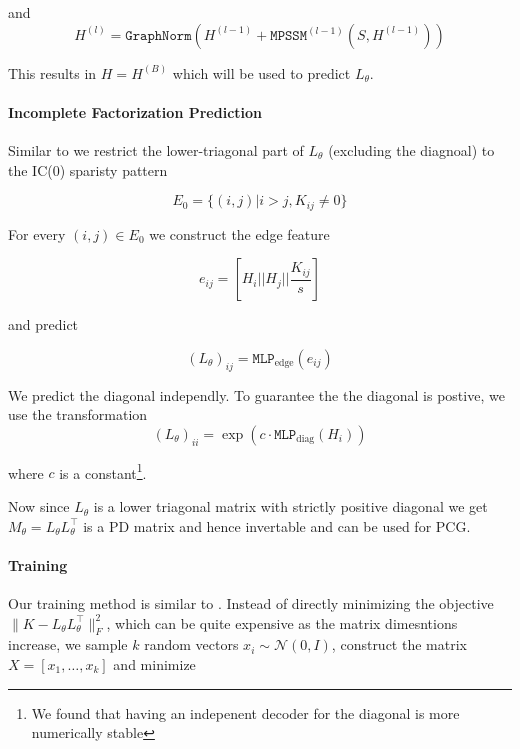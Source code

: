 and
\begin{equation}
    H^{(l)} = \texttt{GraphNorm}(H^{(l - 1)} + \texttt{MPSSM}^{(l - 1)}(S,H^{(l - 1)}))
\end{equation}

This results in $H = H^{(B)}$ which will be used to predict $L_\theta$.

\paragraph{Incomplete Factorization Prediction} Similar to
\cite{hausnerNeuralIncompleteFactorization2024} we restrict the lower-triagonal
part of $L_\theta$ (excluding the diagnoal) to the IC(0) sparisty pattern

\begin{equation}\label{eq:sparsity_pattern}
    E_0 = \{(i,j) | i > j, K_{ij} \neq 0\}
\end{equation}

For every $(i,j) \in E_0$ we construct the edge feature

\begin{equation}
    e_{ij} = \left [ H_i || H_j || \frac{K_{ij}}{s}\right ]
\end{equation}

and predict

\begin{equation}
    (L_\theta)_{ij} = \texttt{MLP}_{\mathrm{edge}}(e_{ij})
\end{equation}

We predict the diagonal independly. To guarantee the the diagonal is postive, we use the transformation
\begin{equation}
    (L_\theta)_{ii} = \exp{(c\cdot \texttt{MLP}_{\mathrm{diag}}(H_i))}
\end{equation}


where $c$ is a constant\footnote{We found that having an indepenent decoder for the
    diagonal is more numerically stable}.

Now since $L_\theta$ is a lower triagonal matrix with strictly positive
diagonal we get $M_\theta = L_\theta L^\top_\theta$ is a PD matrix and hence
invertable and can be used for PCG.

\paragraph{Training} Our training method is similar to
\cite{liNeuralPreconditioningOperator2025,hausnerNeuralIncompleteFactorization2024}. Instead of directly minimizing
the objective $\lVert K - L_\theta L^\top_\theta \rVert^2_F$, which can be
quite expensive as the matrix dimesntions increase, we sample $k$
random vectors $x_i \sim \mathcal N(0,I)$, construct the matrix $X =
        [x_1,\dots,x_k]$ and minimize

